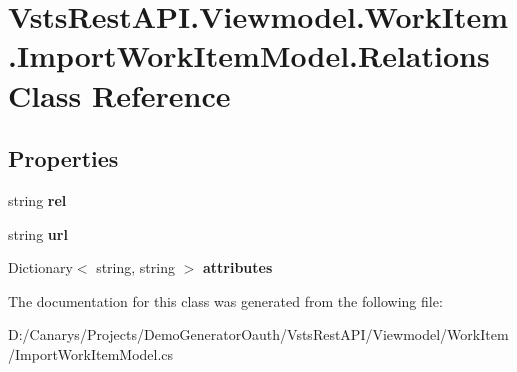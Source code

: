 \hypertarget{class_vsts_rest_a_p_i_1_1_viewmodel_1_1_work_item_1_1_import_work_item_model_1_1_relations}{}\section{Vsts\+Rest\+A\+P\+I.\+Viewmodel.\+Work\+Item.\+Import\+Work\+Item\+Model.\+Relations Class Reference}
\label{class_vsts_rest_a_p_i_1_1_viewmodel_1_1_work_item_1_1_import_work_item_model_1_1_relations}
\subsection*{Properties}
\begin{DoxyCompactItemize}
\item 
\mbox{\label{class_vsts_rest_a_p_i_1_1_viewmodel_1_1_work_item_1_1_import_work_item_model_1_1_relations_ad905d200d8a9c75d1582271de144b5ad}} 
string {\bfseries rel}
\item 
\mbox{\label{class_vsts_rest_a_p_i_1_1_viewmodel_1_1_work_item_1_1_import_work_item_model_1_1_relations_ad94e58e3836f42d3e612ac32759b21d4}} 
string {\bfseries url}
\item 
\mbox{\label{class_vsts_rest_a_p_i_1_1_viewmodel_1_1_work_item_1_1_import_work_item_model_1_1_relations_a2e51839fbf3bd8b56aebac80060070e6}} 
Dictionary$<$ string, string $>$ {\bfseries attributes}
\end{DoxyCompactItemize}


The documentation for this class was generated from the following file\+:\begin{DoxyCompactItemize}
\item 
D\+:/\+Canarys/\+Projects/\+Demo\+Generator\+Oauth/\+Vsts\+Rest\+A\+P\+I/\+Viewmodel/\+Work\+Item/Import\+Work\+Item\+Model.\+cs\end{DoxyCompactItemize}
